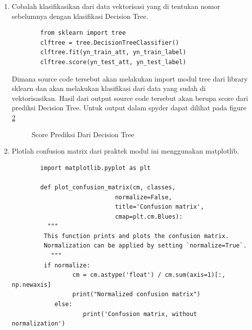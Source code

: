 \begin{enumerate}
Dimana pada source code tersebut akan melakukan import svm dari library sklearn dan akan melakukan klasifikasi dari data yang sudah di vektorisasikan. Hasil output dari source code tersebut berupa score prediksi dari svm. Untuk output dalam spyder dapat dilihat pada figure \ref{YNC4-18}

	\begin{figure}[ht]
		\caption{Score Prediksi Dari SVM}
		\label{YNC4-18}
	\end{figure}

\item Cobalah klasifikasikan dari data vektorisasi yang di tentukan nomor sebelumnya dengan klasifikasi Decision Tree.

	\begin{verbatim}
		from sklearn import tree
		clftree = tree.DecisionTreeClassifier()
		clftree.fit(yn_train_att, yn_train_label)
		clftree.score(yn_test_att, yn_test_label)
	\end{verbatim}

Dimana source code tersebut akan melakukan import modul tree dari library sklearn dan akan melakukan klasifikasi dari data yang sudah di vektorisasikan. Hasil dari output source code tersebut akan berupa score dari prediksi Decision Tree. Untuk output dalam spyder dapat dilihat pada figure \ref{YNC4-19}

	\begin{figure}[ht]
		\caption{Score Prediksi Dari Decision Tree}
		\label{YNC4-19}
	\end{figure}

\item Plotlah confusion matrix dari praktek modul ini menggunakan matplotlib.

	\begin{verbatim}
		import matplotlib.pyplot as plt

		def plot_confusion_matrix(cm, classes,
                         	 normalize=False,
                         	 title='Confusion matrix',
                         	 cmap=plt.cm.Blues):
  		  """
   		 This function prints and plots the confusion matrix.
   		 Normalization can be applied by setting `normalize=True`.
 		   """
   		 if normalize:
       			 cm = cm.astype('float') / cm.sum(axis=1)[:, np.newaxis]
     	   		 print("Normalized confusion matrix")
    		else:
        			print('Confusion matrix, without normalization')


\end{verbatim}
\end{enumerate}

